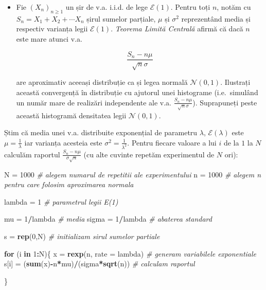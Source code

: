 \documentclass[]{article}
\newenvironment{Shaded}{\begin{snugshade}}{\end{snugshade}}
\newcommand{\KeywordTok}[1]{\textcolor[rgb]{0.13,0.29,0.53}{\textbf{#1}}}
\newcommand{\DataTypeTok}[1]{\textcolor[rgb]{0.13,0.29,0.53}{#1}}
\newcommand{\DecValTok}[1]{\textcolor[rgb]{0.00,0.00,0.81}{#1}}
\newcommand{\StringTok}[1]{\textcolor[rgb]{0.31,0.60,0.02}{#1}}
\newcommand{\CommentTok}[1]{\textcolor[rgb]{0.56,0.35,0.01}{\textit{#1}}}
\newcommand{\ControlFlowTok}[1]{\textcolor[rgb]{0.13,0.29,0.53}{\textbf{#1}}}
\newcommand{\OperatorTok}[1]{\textcolor[rgb]{0.81,0.36,0.00}{\textbf{#1}}}
\newcommand{\NormalTok}[1]{#1}
\newenvironment{frshaded*}{%
  \def\FrameCommand{\fboxrule=\FrameRule\fboxsep=\FrameSep \fcolorbox{framecolor}{shadecolor1}}%
  \MakeFramed {\advance\hsize-\width \FrameRestore}}%
{\endMakeFramed}
\newenvironment{rmdblock}[1]
  {\begin{frshaded*}
  \begin{itemize}
  \renewcommand{\labelitemi}{
    \raisebox{-.7\height}[0pt][0pt]{
      {\setkeys{Gin}{width=2em,keepaspectratio}\texttt{[image: images/icons/\#1]}}
    }
  }
  \item
  }
  {
  \end{itemize}
  \end{frshaded*}
  }
\newenvironment{rmdexercise}
  {\begin{rmdblock}{exercise}}
  {\end{rmdblock}}
\begin{document}
\begin{rmdexercise}
Fie \((X_n)_{n\geq1}\) un șir de v.a. i.i.d. de lege \(\mathcal{E}(1)\).
Pentru toți \(n\), notăm cu \(S_n=X_1+X_2+\cdots X_n\) șirul sumelor
parțiale, \(\mu\) și \(\sigma^2\) reprezentând media și respectiv
varianța legii \(\mathcal{E}(1)\). \emph{Teorema Limită Centrală} afirmă
că dacă \(n\) este mare atunci v.a.

\[
\frac{S_n-n\mu}{\sqrt{n}\sigma}
\]

are aproximativ aceeași distribuție ca și legea normală
\(\mathcal{N}(0,1)\). Ilustrați această convergență în distribuție cu
ajutorul unei histograme (i.e.~simulând un număr mare de realizări
independente ale v.a. \(\frac{S_n-n\mu}{\sqrt{n}\sigma}\)). Suprapuneți
peste această histogramă densitatea legii \(\mathcal{N}(0,1)\).
\end{rmdexercise}

Știm că media unei v.a. distribuite exponențial de parametru
\(\lambda\), \(\mathcal{E}(\lambda)\) este \(\mu=\frac{1}{\lambda}\) iar
varianța acesteia este \(\sigma^2=\frac{1}{\lambda^2}\). Pentru fiecare
valoare a lui \(i\) de la \(1\) la \(N\) calculăm raportul
\(\frac{S_n-n\mu}{\sigma\sqrt{n}}\) (cu alte cuvinte repetăm
experimentul de \(N\) ori):

\begin{Shaded}
\begin{Highlighting}[]
\NormalTok{N =}\StringTok{ }\DecValTok{1000} \CommentTok{# alegem numarul de repetitii ale experimentului}
\NormalTok{n =}\StringTok{ }\DecValTok{1000} \CommentTok{# alegem n pentru care folosim aproximarea normala}

\NormalTok{lambda =}\StringTok{ }\DecValTok{1} \CommentTok{# parametrul legii E(1)}

\NormalTok{mu =}\StringTok{ }\DecValTok{1}\OperatorTok{/}\NormalTok{lambda }\CommentTok{# media}
\NormalTok{sigma =}\StringTok{ }\DecValTok{1}\OperatorTok{/}\NormalTok{lambda }\CommentTok{# abaterea standard }

\NormalTok{s =}\StringTok{ }\KeywordTok{rep}\NormalTok{(}\DecValTok{0}\NormalTok{,N) }\CommentTok{# initializam sirul sumelor partiale}

\ControlFlowTok{for}\NormalTok{ (i }\ControlFlowTok{in} \DecValTok{1}\OperatorTok{:}\NormalTok{N)\{}
\NormalTok{  x =}\StringTok{ }\KeywordTok{rexp}\NormalTok{(n, }\DataTypeTok{rate =}\NormalTok{ lambda) }\CommentTok{# generam variabilele exponentiale}
\NormalTok{  s[i] =}\StringTok{ }\NormalTok{(}\KeywordTok{sum}\NormalTok{(x)}\OperatorTok{-}\NormalTok{n}\OperatorTok{*}\NormalTok{mu)}\OperatorTok{/}\NormalTok{(sigma}\OperatorTok{*}\KeywordTok{sqrt}\NormalTok{(n)) }\CommentTok{# calculam raportul }
  
\NormalTok{\}}
\end{Highlighting}
\end{Shaded}
\end{document}
